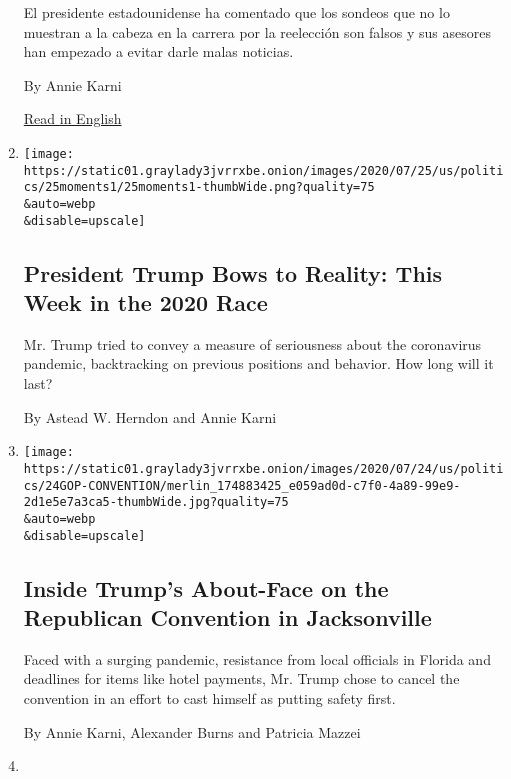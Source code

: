 \begin{enumerate}
  El presidente estadounidense ha comentado que los sondeos que no lo
  muestran a la cabeza en la carrera por la reelección son falsos y sus
  asesores han empezado a evitar darle malas noticias.

  By Annie Karni

  \href{https://www.nytimes3xbfgragh.onion/2020/07/22/us/politics/trump-polls-2020.html}{Read
  in English}
\item
  \href{/2020/07/25/us/politics/trump-biden-polls-coronavirus.html}{}

  \texttt{[image: https://static01.graylady3jvrrxbe.onion/images/2020/07/25/us/politics/25moments1/25moments1-thumbWide.png?quality=75\\\&auto=webp\\\&disable=upscale]}

  \hypertarget{president-trump-bows-to-reality-this-week-in-the-2020-race}{%
  \subsection{President Trump Bows to Reality: This Week in the 2020
  Race}\label{president-trump-bows-to-reality-this-week-in-the-2020-race}}

  Mr. Trump tried to convey a measure of seriousness about the
  coronavirus pandemic, backtracking on previous positions and behavior.
  How long will it last?

  By Astead W. Herndon and Annie Karni
\item
  \href{/2020/07/24/us/politics/trump-republican-convention-canceled-jacksonville.html}{}

  \texttt{[image: https://static01.graylady3jvrrxbe.onion/images/2020/07/24/us/politics/24GOP-CONVENTION/merlin\_174883425\_e059ad0d-c7f0-4a89-99e9-2d1e5e7a3ca5-thumbWide.jpg?quality=75\\\&auto=webp\\\&disable=upscale]}

  \hypertarget{inside-trumps-about-face-on-the-republican-convention-in-jacksonville}{%
  \subsection{Inside Trump's About-Face on the Republican Convention in
  Jacksonville}\label{inside-trumps-about-face-on-the-republican-convention-in-jacksonville}}

  Faced with a surging pandemic, resistance from local officials in
  Florida and deadlines for items like hotel payments, Mr. Trump chose
  to cancel the convention in an effort to cast himself as putting
  safety first.

  By Annie Karni, Alexander Burns and Patricia Mazzei
\item
  \href{/2020/07/23/us/politics/jacksonville-rnc.html}{}


\end{enumerate}
